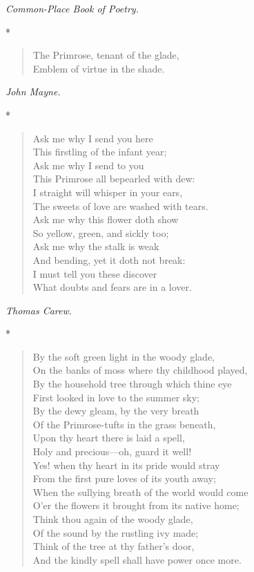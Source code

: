\documentclass[11pt,twoside]{article}
\newcommand\stars{\begin{center}*\quad*\quad*\end{center}}
\newcommand\by[1]{\par\hfill\textit{#1}\par}
\begin{document}
\by{Common-Place Book of Poetry.}

\stars

\begin{verse}
The Primrose, tenant of the glade,\\
Emblem of virtue in the shade.
\end{verse}

\by{John Mayne.}

\stars

\begin{verse}
Ask me why I send you here\\
This firstling of the infant year;\\
Ask me why I send to you\\
This Primrose all bepearled with dew:\\
I straight will whisper in your ears,\\
The sweets of love are washed with tears.\\
Ask me why this flower doth show\\
So yellow, green, and sickly too;\\
Ask me why the stalk is weak\\
And bending, yet it doth not break:\\
I must tell you these discover\\
What doubts and fears are in a lover.
\end{verse}

\by{Thomas Carew.}

\stars

\begin{verse}
By the soft green light in the woody glade,\\
On the banks of moss where thy childhood played,\\
By the household tree through which thine eye\\
First looked in love to the summer sky;\\
By the dewy gleam, by the very breath\\
Of the Primrose-tufts in the grass beneath,\\
Upon thy heart there is laid a spell,\\
Holy and precious---oh, guard it well!\\
Yes! when thy heart in its pride would stray\\
From the first pure loves of its youth away;\\
When the sullying breath of the world would come\\
O’er the flowers it brought from its native home;\\
Think thou again of the woody glade,\\
Of the sound by the rustling ivy made;\\
Think of the tree at thy father’s door,\\
And the kindly spell shall have power once more.
\end{verse}
\end{document}
